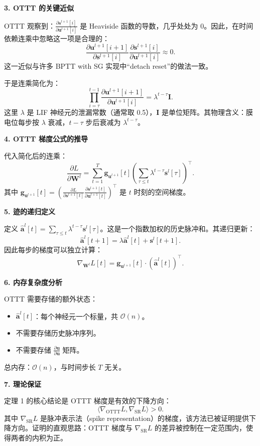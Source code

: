 \documentclass[journal,12pt,onecolumn]{IEEEtran}
\begin{document}
\medskip\noindent\textbf{3. OTTT 的关键近似}

OTTT 观察到：$\frac{\partial \mathbf{s}^{l+1}[i]}{\partial \mathbf{u}^{l+1}[i]}$ 是 Heaviside 函数的导数，几乎处处为 0。因此，在时间依赖连乘中忽略这一项是合理的：
\[
\frac{\partial \mathbf{u}^{l+1}[i+1]}{\partial \mathbf{s}^{l+1}[i]} \frac{\partial \mathbf{s}^{l+1}[i]}{\partial \mathbf{u}^{l+1}[i]} \approx 0.
\]
这一近似与许多 BPTT with SG 实现中“detach reset”的做法一致。

于是连乘简化为：
\[
\prod_{i=\tau}^{t-1} \frac{\partial \mathbf{u}^{l+1}[i+1]}{\partial \mathbf{u}^{l+1}[i]} = \lambda^{t-\tau} \mathbf{I}.
\]
这里 $\lambda$ 是 LIF 神经元的泄漏常数（通常取 0.5），$\mathbf{I}$ 是单位矩阵。其物理含义：膜电位每步按 $\lambda$ 衰减，$t-\tau$ 步后衰减为 $\lambda^{t-\tau}$。

\medskip\noindent\textbf{4. OTTT 梯度公式的推导}

代入简化后的连乘：
\[
\frac{\partial L}{\partial \mathbf{W}^l} = \sum_{t=1}^T \mathbf{g}_{\mathbf{u}^{l+1}}[t] \left( \sum_{\tau \le t} \lambda^{t-\tau} \mathbf{s}^l[\tau] \right)^\top. \tag{4}
\]
其中 $\mathbf{g}_{\mathbf{u}^{l+1}}[t] = \left( \frac{\partial L}{\partial \mathbf{s}^{l+1}[t]} \frac{\partial \mathbf{s}^{l+1}[t]}{\partial \mathbf{u}^{l+1}[t]} \right)^\top$ 是 $t$ 时刻的空间梯度。

\medskip\noindent\textbf{5. 迹的递归定义}

定义 $\hat{\mathbf{a}}^l[t] = \sum_{\tau \le t} \lambda^{t-\tau} \mathbf{s}^l[\tau]$。这是一个指数加权的历史脉冲和。其递归更新：
\[
\hat{\mathbf{a}}^l[t+1] = \lambda \hat{\mathbf{a}}^l[t] + \mathbf{s}^l[t+1]. \tag{4}
\]
因此每步的梯度可以独立计算：
\[
\nabla_{\mathbf{W}^l} L[t] = \mathbf{g}_{\mathbf{u}^{l+1}}[t] \cdot (\hat{\mathbf{a}}^l[t])^\top. \tag{4}
\]

\medskip\noindent\textbf{6. 内存复杂度分析}

OTTT 需要存储的额外状态：
\begin{itemize}
    \item $\hat{\mathbf{a}}^l[t]$：每个神经元一个标量，共 $\mathcal{O}(n)$。
    \item 不需要存储历史脉冲序列。
    \item 不需要存储 $\frac{\partial \mathbf{u}}{\partial \mathbf{u}}$ 矩阵。
\end{itemize}
总内存：$\mathcal{O}(n)$，与时间步长 $T$ 无关。

\medskip\noindent\textbf{7. 理论保证}

定理 1 的核心结论是 OTTT 梯度是有效的下降方向：
\[
\langle \nabla_{\text{OTTT}}L, \nabla_{\text{SR}}L \rangle > 0.
\]
其中 $\nabla_{\text{SR}}L$ 是脉冲表示法（spike representation）的梯度，该方法已被证明提供下降方向。证明的直观思路：OTTT 梯度与 $\nabla_{\text{SR}}L$ 的差异被控制在一定范围内，使得两者的内积为正。
\end{document}
